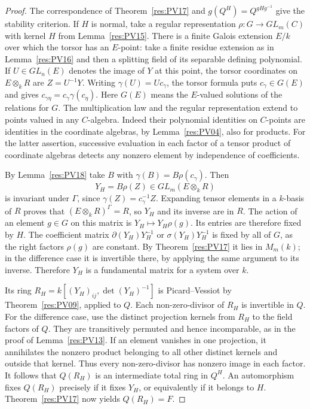 \begin{proof}
The correspondence of Theorem~\ref{res:PV17} and
\(g(Q^H)=Q^{gHg^{-1}}\) give the stability criterion.
If \(H\) is normal, take a regular representation
\(\rho:G\to GL_m(C)\) with kernel \(H\) from
Lemma~\ref{res:PV15}. There is a finite Galois extension \(E/k\)
over which the torsor has an \(E\)-point: take a finite residue
extension as in Lemma~\ref{res:PV16} and then a splitting
field of its separable defining polynomial. If \(U\in GL_n(E)\)
denotes the image of \(Y\) at this point, the torsor coordinates
on \(E\otimes_k R\) are \(Z=U^{-1}Y\). Writing
\(\gamma(U)=U c_\gamma\), the torsor formula puts
\(c_\gamma\in G(E)\) and gives
\(c_{\gamma\eta}=c_\gamma\gamma(c_\eta)\). Here \(G(E)\)
means the \(E\)-valued solutions of the relations for \(G\).
The multiplication law and the regular representation extend
to points valued in any \(C\)-algebra. Indeed their polynomial identities on
\(C\)-points are identities in the coordinate algebras,
by Lemma~\ref{res:PV04}, also for products. For the latter
assertion, successive evaluation in each factor of a
tensor product of coordinate algebras detects any nonzero
element by independence of coefficients.

By Lemma~\ref{res:PV18} take \(B\) with
\(\gamma(B)=B\rho(c_\gamma)\). Then
\[
 Y_H=B\rho(Z)\in GL_m(E\otimes_k R)
\]
is invariant under \(\Gamma\), since
\(\gamma(Z)=c_\gamma^{-1} Z\).
Expanding tensor elements in a \(k\)-basis of \(R\) proves
that \((E\otimes_k R)^\Gamma=R\), so \(Y_H\) and its inverse
are in \(R\). The action of an element \(g\in G\) on this
matrix is \(Y_H\mapsto Y_H\rho(g)\). Its entries are therefore
fixed by \(H\). The coefficient matrix
\(\partial(Y_H)Y_H^{-1}\) or \(\sigma(Y_H)Y_H^{-1}\) is
fixed by all of \(G\), as the right factors \(\rho(g)\)
are constant. By Theorem~\ref{res:PV17} it lies in \(M_m(k)\);
in the difference case it is invertible there, by applying
the same argument to its inverse. Therefore \(Y_H\) is a
fundamental matrix for a system over \(k\).

Its ring \(R_H=k[(Y_H)_{ij},\det(Y_H)^{-1}]\) is
Picard--Vessiot by Theorem~\ref{res:PV09}, applied to \(Q\).
Each non-zero-divisor of \(R_H\) is invertible in \(Q\).
For the difference case, use the distinct projection kernels
from \(R_H\) to the field factors of \(Q\). They are
transitively permuted and hence incomparable, as in the proof
of Lemma~\ref{res:PV13}. If an element vanishes in one
projection, it annihilates the nonzero product belonging to
all other distinct kernels and outside that kernel. Thus
every non-zero-divisor has nonzero image in each factor.
It follows that \(Q(R_H)\) is an intermediate total ring in
\(Q^H\). An automorphism fixes \(Q(R_H)\) precisely if it
fixes \(Y_H\), or equivalently if it belongs to \(H\).
Theorem~\ref{res:PV17} now yields \(Q(R_H)=F\).


\end{proof}
